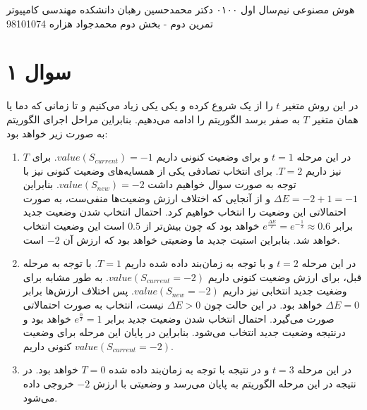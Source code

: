 \documentclass[a4paper, 12pt]{article}
\begin{document}
\handout
{هوش مصنوعی}
{نیم‌سال اول ۰۱\lr{-}۰۰}
{دکتر محمدحسین رهبان}
{دانشکده مهندسی کامپیوتر}
{تمرین دوم - بخش دوم}
{محمدجواد هزاره}
{98101074}
\noindent
\\ [-5em]
\section*{سوال ۱}
در این روش متغیر $t$ را از یک شروع کرده و یکی یکی زیاد می‌کنیم و تا زمانی که دما یا همان متغیر $T$ به صفر برسد الگوریتم را ادامه می‌دهیم. بنابراین مراحل اجرای الگوریتم به صورت زیر خواهد بود:
\begin{enumerate}[1.]
	\item
	در این مرحله $t = 1$ و برای وضعیت کنونی داریم
	$value(S_{current}) = -1$.
	برای $T$ نیز داریم $T = 2$. برای انتخاب تصادفی یکی از همسایه‌های وضعیت کنونی نیز با توجه به صورت سوال خواهیم داشت
	$value(S_{new}) = -2$.
	بنابراین 
	$\Delta E = -2 + 1 = -1$
	و از آنجایی که اختلاف ارزش وضعیت‌ها منفی‌ست، به صورت احتمالاتی این وضعیت را انتخاب خواهیم کرد. احتمال انتخاب شدن وضعیت جدید برابر 
	$e^{\frac{\Delta E}{T}} = e^{-\frac{1}{2}} \approx 0.6$
	خواهد بود که چون بیش‌تر از $0.5$ است این وضعیت انتخاب خواهد شد. بنابراین استیت جدید ما وضعیتی خواهد بود که ارزش آن $-2$ است. 
	\item
	در این مرحله $t = 2$ و با توجه به زمان‌بند داده شده داریم $T = 1$. با توجه به مرحله قبل، برای ارزش وضعیت کنونی داریم
	$value(S_{current} = -2)$.
	به طور مشابه برای وضغیت جدید انتخابی نیز داریم
	$value(S_{new} = -2)$.
	پس اختلاف ارزش‌ها برابر
	$\Delta E = 0$
	خواهد بود. در این حالت چون
	$\Delta E > 0$
	نیست، انتخاب به صورت احتمالاتی صورت می‌گیرد. احتمال انتخاب شدن وضعیت جدید برابر 
	$e^{\frac{0}{T}} = 1$
	خواهد بود و درنتیجه وضعیت جدید انتخاب می‌شود. بنابراین در پایان این مرحله برای وضعیت کنونی داریم 
	$value(S_{current} = -2)$.
	\item
	در این مرحله $t=3$ و در نتیجه با توجه به زمان‌بند داده شده $T=0$ خواهد بود. در نتیجه در این مرحله الگوریتم به پایان می‌رسد و وضعیتی با ارزش $-2$ خروجی داده می‌شود.
\end{enumerate}
\end{document}
